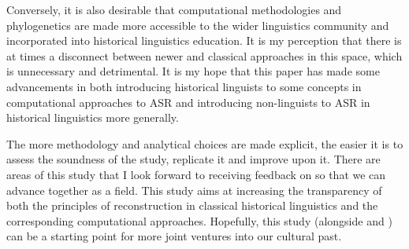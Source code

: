 \documentclass[12pt,letterpaper]{article}
\begin{document}
Conversely, it is also desirable that computational methodologies and phylogenetics are made more accessible to the wider linguistics community and incorporated into historical linguistics education. It is my perception that there is at times a disconnect between newer and classical approaches in this space, which is unnecessary and detrimental. It is my hope that this paper has made some advancements in both introducing historical linguists to some concepts in computational approaches to ASR and introducing non-linguists to ASR in historical linguistics more generally.

The more methodology and analytical choices are made explicit, the easier it is to assess the soundness of the study, replicate it and improve upon it. There are areas of this study that I look forward to receiving feedback on so that we can advance together as a field. This study aims at increasing the transparency of both the principles of reconstruction in classical historical linguistics and the corresponding computational approaches. Hopefully, this study (alongside \citet{carling2021reconstructing} and \citet{goldstein_2022}) can be a starting point for more joint ventures into our cultural past.







\end{document}
